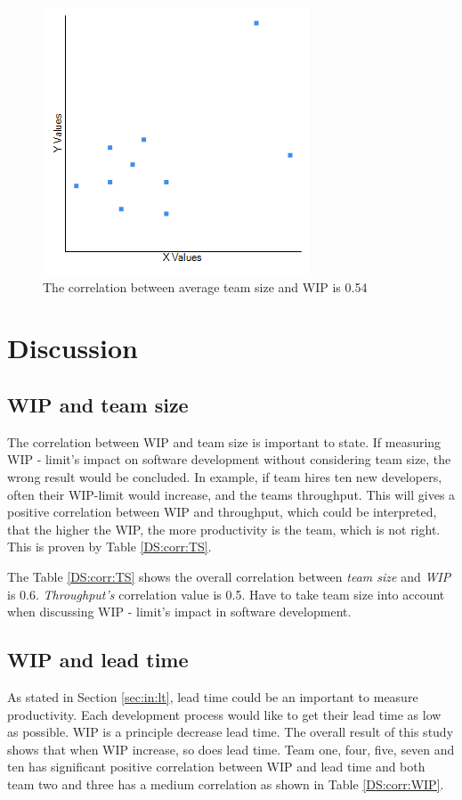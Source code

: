 \documentclass[UKenglish]{ifimaster}  %
\begin{document}
 \begin{figure}[b]
 \center
\includegraphics{Picture/TeamSize/TeamSizeVsWIP.png} 
 \caption{The correlation between average team size and WIP is 0.54} 
\label{fig:TS:WIP}
  \end{figure}
 
 
 
\chapter{Discussion}
\label{ch:dis}
\section{WIP and team size}
The correlation between WIP and team size is important to state. If measuring WIP - limit's impact on software development without considering team size, the wrong result would be concluded. In example, if team hires ten new developers, often their WIP-limit would increase, and the teams throughput. This will gives a positive correlation between WIP and throughput, which could be interpreted, that the higher the WIP, the more productivity is the team, which is not right. This is proven by Table \ref{DS:corr:TS}.

The Table \ref{DS:corr:TS} shows the overall correlation between \textit{team size} and \textit{WIP} is 0.6. \textit{Throughput's} correlation value is 0.5. Have to take team size into account when discussing WIP - limit's impact in software development. 

 


\section{WIP and lead time}
As stated in Section \ref{sec:in:lt}, lead time could be an important to measure productivity. Each development process would like to get their lead time as low as possible. WIP is a principle decrease lead time.  The overall result of this study shows that when WIP increase, so does lead time. Team one, four, five, seven and ten has significant positive correlation between WIP and lead time and both team two and three has a medium correlation as shown in Table \ref{DS:corr:WIP}. 
\end{document}

